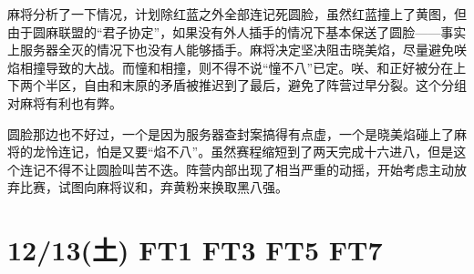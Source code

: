 麻将分析了一下情况，计划除红蓝之外全部连记死圆脸，虽然红蓝撞上了黄图，但由于圆麻联盟的“君子协定”，如果没有外人插手的情况下基本保送了圆脸——事实上服务器全灭的情况下也没有人能够插手。麻将决定坚决阻击晓美焰，尽量避免咲焰相撞导致的大战。而憧和相撞，则不得不说“憧不八”已定。咲、和正好被分在上下两个半区，自由和末原的矛盾被推迟到了最后，避免了阵营过早分裂。这个分组对麻将有利也有弊。

圆脸那边也不好过，一个是因为服务器查封案搞得有点虚，一个是晓美焰碰上了麻将的龙怜连记，怕是又要“焰不八”。虽然赛程缩短到了两天完成十六进八，但是这个连记不得不让圆脸叫苦不迭。阵营内部出现了相当严重的动摇，开始考虑主动放弃比赛，试图向麻将议和，弃黄粉来换取黑八强。

\section{12/13(土) FT1 FT3 FT5 FT7}


